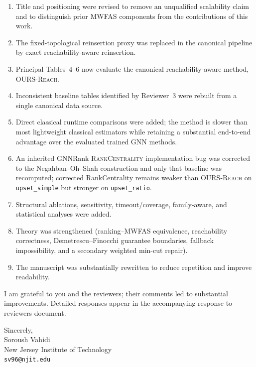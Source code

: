 \documentclass[11pt]{article}
\begin{document}
\begin{enumerate}
\item Title and positioning were revised to remove an unqualified scalability claim and to distinguish prior MWFAS components from the contributions of this work.
\item The fixed-topological reinsertion proxy was replaced in the canonical pipeline by exact reachability-aware reinsertion.
\item Principal Tables~4--6 now evaluate the canonical reachability-aware method, \textsc{OURS-Reach}.
\item Inconsistent baseline tables identified by Reviewer~3 were rebuilt from a single canonical data source.
\item Direct classical runtime comparisons were added; the method is slower than most lightweight classical estimators while retaining a substantial end-to-end advantage over the evaluated trained GNN methods.
\item An inherited GNNRank \textsc{RankCentrality} implementation bug was corrected to the Negahban--Oh--Shah construction and only that baseline was recomputed; corrected RankCentrality remains weaker than \textsc{OURS-Reach} on \texttt{upset\_simple} but stronger on \texttt{upset\_ratio}.
\item Structural ablations, sensitivity, timeout/coverage, family-aware, and statistical analyses were added.
\item Theory was strengthened (ranking--MWFAS equivalence, reachability correctness, Demetrescu--Finocchi guarantee boundaries, fallback impossibility, and a secondary weighted min-cut repair).
\item The manuscript was substantially rewritten to reduce repetition and improve readability.
\end{enumerate}

I am grateful to you and the reviewers; their comments led to substantial improvements.
Detailed responses appear in the accompanying response-to-reviewers document.

\vspace{0.85em}
Sincerely,\\[1.0em]
Soroush Vahidi\\
New Jersey Institute of Technology\\
\texttt{sv96@njit.edu}
\end{document}
